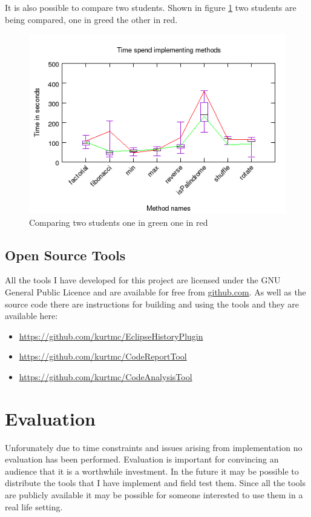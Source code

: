 \documentclass[twocolumn]{article}
\begin{document}
It is also possible to compare two students. Shown in figure \ref{fig:student2}
two students are being compared, one in greed the other in red.

\begin{figure}[h!bt]
\includegraphics[width=\linewidth]{figures/student2}
\caption{Comparing two students one in green one in red}
\label{fig:student2}
\end{figure}

\subsection{Open Source Tools}
All the tools I have developed for this project are licensed under the GNU
General Public Licence and are available for free from \url{github.com}. As
well as the source code there are instructions for building and using the tools
and they are available here:
{\footnotesize
\begin{itemize}
\item \url{https://github.com/kurtmc/EclipseHistoryPlugin}
\item \url{https://github.com/kurtmc/CodeReportTool}
\item \url{https://github.com/kurtmc/CodeAnalysisTool}
\end{itemize}
}


\section{Evaluation}
Unforunately due to time constraints and issues arising from implementation no
evaluation has been performed. Evaluation is important for convincing an
audience that it is a worthwhile investment. In the future it may be possible
to distribute the tools that I have implement and field test them. Since all
the tools are publicly available it may be possible for someone interested to
use them in a real life setting.
\end{document}
